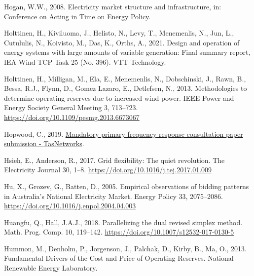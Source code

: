 \documentclass[12pt,a4paper,]{report}
\newlength{\cslhangindent}
\newenvironment{CSLReferences}[2] %
 {%
  \setlength{\parindent}{0pt}
  \ifodd #1 \everypar{\setlength{\hangindent}{\cslhangindent}}\ignorespaces\fi
  \ifnum #2 > 0
  \setlength{\parskip}{#2\baselineskip}
  \fi
 }%
 {}
\begin{document}
\begin{CSLReferences}{1}{0}
\leavevmode{}%
Hogan, W.W., 2008. Electricity market structure and infrastructure, in:
Conference on {Acting} in {Time} on {Energy Policy}.

\leavevmode{}%
Holttinen, H., Kiviluoma, J., Helisto, N., Levy, T., Menemenlis, N.,
Jun, L., Cutululis, N., Koivisto, M., Das, K., Orths, A., 2021. Design
and operation of energy systems with large amounts of variable
generation: {Final} summary report, {IEA Wind TCP Task} 25 (No. 396).
VTT Technology.

\leavevmode{}%
Holttinen, H., Milligan, M., Ela, E., Menemenlis, N., Dobschinski, J.,
Rawn, B., Bessa, R.J., Flynn, D., Gomez Lazaro, E., Detlefsen, N., 2013.
Methodologies to determine operating reserves due to increased wind
power. IEEE Power and Energy Society General Meeting 3, 713--723.
\url{https://doi.org/10.1109/pesmg.2013.6673067}

\leavevmode{}%
Hopwood, C., 2019.
\href{https://www.aemc.gov.au/sites/default/files/2019-11/Rule\%20Change\%20SubmissionERC0274\%20-\%20TasNetworks\%20-\%2020191031.PDF}{Mandatory
primary frequency response consultation paper submission -
{TasNetworks}}.

\leavevmode{}%
Hsieh, E., Anderson, R., 2017. Grid flexibility: {The} quiet revolution.
The Electricity Journal 30, 1--8.
\url{https://doi.org/10.1016/j.tej.2017.01.009}

\leavevmode{}%
Hu, X., Grozev, G., Batten, D., 2005. Empirical observations of bidding
patterns in {Australia}'s {National Electricity Market}. Energy Policy
33, 2075--2086. \url{https://doi.org/10.1016/j.enpol.2004.04.003}

\leavevmode{}%
Huangfu, Q., Hall, J.A.J., 2018. Parallelizing the dual revised simplex
method. Math. Prog. Comp. 10, 119--142.
\url{https://doi.org/10.1007/s12532-017-0130-5}

\leavevmode{}%
Hummon, M., Denholm, P., Jorgenson, J., Palchak, D., Kirby, B., Ma, O.,
2013. Fundamental {Drivers} of the {Cost} and {Price} of {Operating
Reserves}. National Renewable Energy Laboratory.


\end{CSLReferences}
\end{document}
